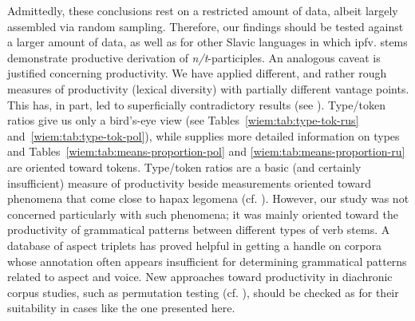 \documentclass[output=paper]{langscibook}
\begin{document}
Admittedly, these conclusions rest on a restricted amount of data, albeit largely assembled via random sampling. Therefore, our findings should be tested against a larger amount of data, as well as for other Slavic languages in which ipfv. stems demonstrate productive derivation of \textit{n/t}-participles. An analogous caveat is justified concerning productivity. We have applied different, and rather rough measures of productivity (lexical diversity) with partially different vantage points. This has, in part, led to superficially contradictory results (see ). Type/token ratios give us only a bird’s-eye view (see Tables~\ref{wiem:tab:type-tok-rus} and~\ref{wiem:tab:type-tok-pol}), while  supplies more detailed information on types and Tables~\ref{wiem:tab:means-proportion-pol} and \ref{wiem:tab:means-proportion-ru} are oriented toward tokens. Type\slash token ratios are a basic (and certainly insufficient) measure of productivity beside measurements oriented toward phenomena that come close to hapax legomena (cf. \citealt{Baayen2009}). However, our study was not concerned particularly with such phenomena; it was mainly oriented toward the productivity of grammatical patterns between different types of verb stems. A database of aspect triplets has proved helpful in getting a handle on corpora whose annotation often appears insufficient for determining grammatical patterns related to aspect and voice. New approaches toward productivity in diachronic corpus studies, such as permutation testing (cf. \citealt{Säily.Suomela2017}), should be checked as for their suitability in cases like the one presented here.



\end{document}
